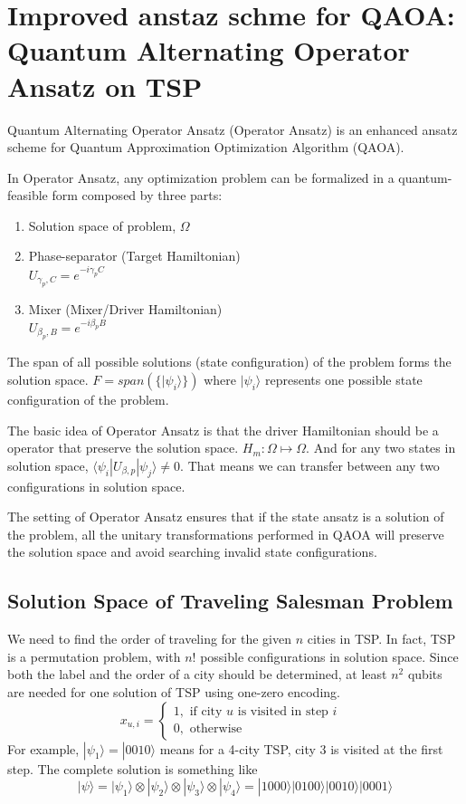 \documentclass[aps,pra,twocolumn,superscriptaddress]{revtex4-2}
\begin{document}
\section{Improved anstaz schme for QAOA: Quantum Alternating Operator Ansatz on TSP\label{app:QMC}}
Quantum Alternating Operator Ansatz\cite{} (Operator Ansatz) is an enhanced ansatz scheme for Quantum Approximation Optimization Algorithm (QAOA).

In Operator Ansatz, any optimization problem can be formalized in a quantum-feasible form composed by three parts:

\begin{enumerate}
    \item Solution space of problem, $\Omega$
    \item Phase-separator (Target Hamiltonian)\\
    $U_{\gamma_p,C}=e^{-i\gamma_p C}$
    \item Mixer (Mixer/Driver Hamiltonian)\\
    $U_{\beta_p,B}=e^{-i\beta_p B}$
\end{enumerate}

The span of all possible solutions (state configuration) of the problem forms the solution space. $F=span(\{|\psi_i\rangle\})$ where $|\psi_i\rangle$ represents one possible state configuration of the problem. 

The basic idea of Operator Ansatz is that the driver Hamiltonian should be a operator that preserve the solution space. $H_{m}: \Omega \mapsto \Omega $. And for any two 
states in solution space, $\langle \psi_i|U_{\beta,p}|\psi_j\rangle \neq 0$. That means we can transfer between any two configurations in solution space.

The setting of Operator Ansatz ensures that if the state ansatz is a solution of the problem, all the unitary transformations performed in QAOA will preserve the solution space and avoid searching invalid state configurations.
\subsection{Solution Space of Traveling Salesman Problem}
We need to find the order of traveling for the given $n$ cities in TSP. In fact, TSP is a permutation problem, with $n!$ possible configurations in solution space. Since both the label and the order of a city should be determined, at least $n^2$ qubits are needed for one solution of TSP using one-zero encoding.
$$
x_{u,i}=
\begin{cases}
1, \text{ if city $u$ is visited in step $i$ } \\
0, \text{ otherwise}
\end{cases}
$$
For example, $|\psi_1\rangle=|0010\rangle$ means for a 4-city TSP, city 3 is visited at the first step. The complete solution is something like 
$$|\psi\rangle=|\psi_1\rangle\otimes|\psi_2\rangle\otimes|\psi_3\rangle\otimes|\psi_4\rangle=|1000\rangle|0100\rangle |0010\rangle |0001\rangle$$
\end{document}
